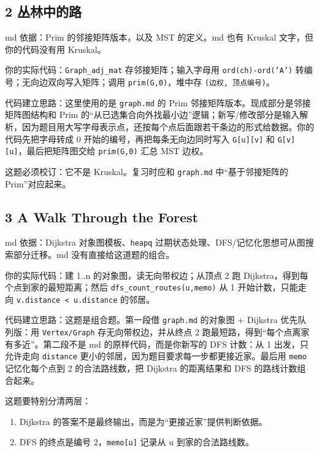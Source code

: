 \documentclass[10pt,a4paper,fontset=none]{ctexart}
\begin{document}
\subsection{2 丛林中的路}
\begin{sourcebox}
md 依据：Prim 的邻接矩阵版本，以及 MST 的定义。md 也有 Kruskal 文字，但你的代码没有用 Kruskal。
\end{sourcebox}
\begin{methodbox}
你的实际代码：\texttt{Graph\_adj\_mat} 存邻接矩阵；输入字母用 \texttt{ord(ch)-ord('A')} 转编号；无向边双向写入矩阵；调用 \texttt{prim(G,0)}，堆中存 \texttt{(边权, 顶点编号)}。

代码建立思路：这里使用的是 \texttt{graph.md} 的 Prim 邻接矩阵版本。现成部分是邻接矩阵图结构和 Prim 的“从已选集合向外找最小边”逻辑；新写/修改部分是输入解析，因为题目用大写字母表示点，还按每个点后面跟若干条边的形式给数据。你的代码先把字母转成 0 开始的编号，再把每条无向边同时写入 \texttt{G[u][v]} 和 \texttt{G[v][u]}，最后把矩阵图交给 \texttt{prim(G,0)} 汇总 MST 边权。
\end{methodbox}
这题必须校订：它不是 Kruskal。复习时应和 \texttt{graph.md} 中“基于邻接矩阵的 Prim”对应起来。

\subsection{3 A Walk Through the Forest}
\begin{sourcebox}
md 依据：Dijkstra 对象图模板、\texttt{heapq} 过期状态处理、DFS/记忆化思想可从图搜索部分迁移。md 没有直接给这道题的组合。
\end{sourcebox}
\begin{methodbox}
你的实际代码：建 1..n 的对象图，读无向带权边；从顶点 2 跑 Dijkstra，得到每个点到家的最短距离；然后 \texttt{dfs\_count\_routes(u,memo)} 从 1 开始计数，只能走向 \texttt{v.distance < u.distance} 的邻居。

代码建立思路：这题是组合题。第一段借 \texttt{graph.md} 的对象图 + Dijkstra 优先队列版：用 \texttt{Vertex/Graph} 存无向带权边，并从终点 2 跑最短路，得到“每个点离家有多近”。第二段不是 md 的原样代码，而是你新写的 DFS 计数：从 1 出发，只允许走向 \texttt{distance} 更小的邻居，因为题目要求每一步都更接近家。最后用 \texttt{memo} 记忆化每个点到 2 的合法路线数，把 Dijkstra 的距离结果和 DFS 的路线计数组合起来。
\end{methodbox}
这题要特别分清两层：
\begin{enumerate}
  \item Dijkstra 的答案不是最终输出，而是为“更接近家”提供判断依据。
  \item DFS 的终点是编号 2，\texttt{memo[u]} 记录从 u 到家的合法路线数。
\end{enumerate}
\end{document}
